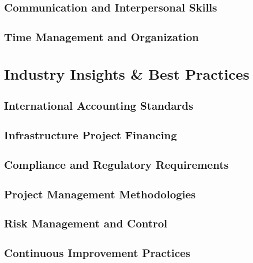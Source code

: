 \subsection{Communication and Interpersonal Skills}

\subsection{Time Management and Organization}

\section{Industry Insights \& Best Practices}

\subsection{International Accounting Standards}

\subsection{Infrastructure Project Financing}

\subsection{Compliance and Regulatory Requirements}

\subsection{Project Management Methodologies}

\subsection{Risk Management and Control}

\subsection{Continuous Improvement Practices}
